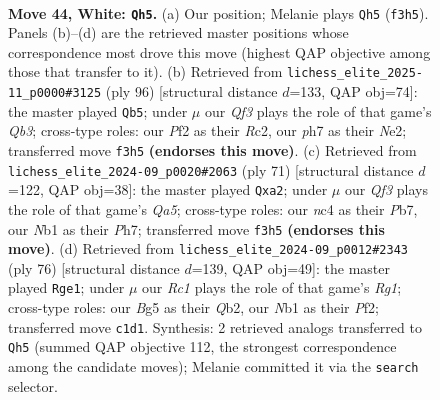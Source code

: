 \documentclass[11pt]{article}
\begin{document}
\clearpage

\begin{figure}[p]\centering
\begin{subfigure}{0.46\textwidth}\centering
\resizebox{\linewidth}{!}{%
\newchessgame
\chessboard[
  setfen={r4k2/7p/bq2p3/p2pbpB1/P1np3P/5Q2/5P2/RNR1N1K1 w - - 8 44},
  showmover=false,
  pgfstyle=straightmove, color=movearrow, markmove={f3-h5}
]}
\caption{}
\end{subfigure}\hfill
\begin{subfigure}{0.46\textwidth}\centering
\resizebox{\linewidth}{!}{%
\newchessgame
\chessboard[
  setfen={1b1k4/1b5q/1p2r1nN/3p2p1/B2Pp1Pp/PQ5P/2R1NP2/4K3 w - - 9 49},
  showmover=false,
  pgfstyle=straightmove, color=movearrow, markmove={b3-b5}
]}
\caption{}
\end{subfigure}
\\[4pt]
\begin{subfigure}{0.46\textwidth}\centering
\resizebox{\linewidth}{!}{%
\newchessgame
\chessboard[
  setfen={5r1k/ppp4p/1n3b1P/5B2/q2NQ1P1/2P3B1/PP4P1/2K5 b - - 2 36},
  showmover=false,
  pgfstyle=straightmove, color=movearrow, markmove={a4-a2}
]}
\caption{}
\end{subfigure}\hfill
\begin{subfigure}{0.46\textwidth}\centering
\resizebox{\linewidth}{!}{%
\newchessgame
\chessboard[
  setfen={3r2k1/1p3ppp/6b1/1Pn2q2/p1B5/P3R2P/1Q3P2/K5R1 w - - 9 39},
  showmover=false,
  pgfstyle=straightmove, color=movearrow, markmove={g1-e1}
]}
\caption{}
\end{subfigure}
\caption{\textbf{Move 44, White: \texttt{Qh5}.} (a) Our position; Melanie plays \texttt{Qh5} (\texttt{f3h5}). Panels (b)--(d) are the retrieved master positions whose correspondence most drove this move (highest QAP objective among those that transfer to it). (b) Retrieved from \texttt{lichess\_elite\_2025-11\_p0000\#3125} (ply 96) [structural distance $d$=133, QAP obj=74]: the master played \texttt{Qb5}; under $\mu$ our \emph{Qf3} plays the role of that game's \emph{Qb3}; cross-type roles: our \emph{P}f2 as their \emph{R}c2, our \emph{p}h7 as their \emph{N}e2; transferred move \texttt{f3h5} \textbf{(endorses this move)}. (c) Retrieved from \texttt{lichess\_elite\_2024-09\_p0020\#2063} (ply 71) [structural distance $d$=122, QAP obj=38]: the master played \texttt{Qxa2}; under $\mu$ our \emph{Qf3} plays the role of that game's \emph{Qa5}; cross-type roles: our \emph{n}c4 as their \emph{P}b7, our \emph{N}b1 as their \emph{P}h7; transferred move \texttt{f3h5} \textbf{(endorses this move)}. (d) Retrieved from \texttt{lichess\_elite\_2024-09\_p0012\#2343} (ply 76) [structural distance $d$=139, QAP obj=49]: the master played \texttt{Rge1}; under $\mu$ our \emph{Rc1} plays the role of that game's \emph{Rg1}; cross-type roles: our \emph{B}g5 as their \emph{Q}b2, our \emph{N}b1 as their \emph{P}f2; transferred move \texttt{c1d1}. Synthesis: 2 retrieved analogs transferred to \texttt{Qh5} (summed QAP objective 112, the strongest correspondence among the candidate moves); Melanie committed it via the \texttt{search} selector.}
\label{fig:thought-m86}
\end{figure}
\end{document}
